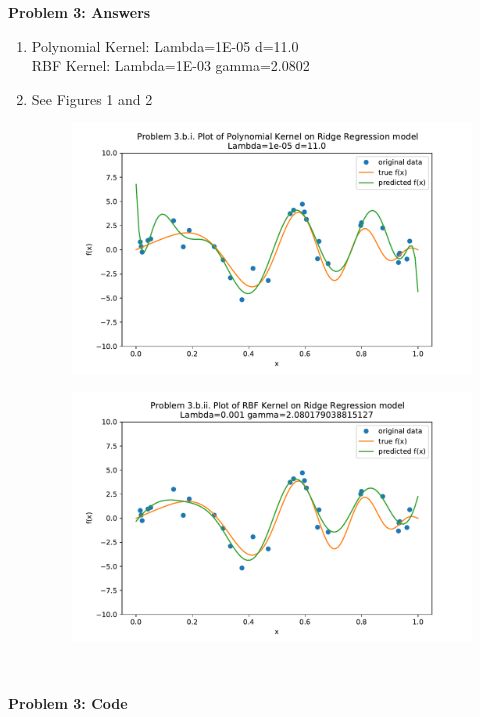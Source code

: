 {\bf Problem 3: Answers}
\begin{enumerate}
    \item Polynomial Kernel: Lambda=1E-05 d=11.0\\
	RBF Kernel: Lambda=1E-03 gamma=2.0802
    \item See Figures 1 and 2
	\begin{figure}[h!]
	    \centering
	    \includegraphics[width=0.8\linewidth]{../plots/3bi.pdf}
	    \caption{}
	\end{figure}
	\begin{figure}[h!]
	    \centering
	    \includegraphics[width=0.8\linewidth]{../plots/3bii.pdf}
	    \caption{}
	\end{figure} \\
\end{enumerate}

{\bf Problem 3: Code}

